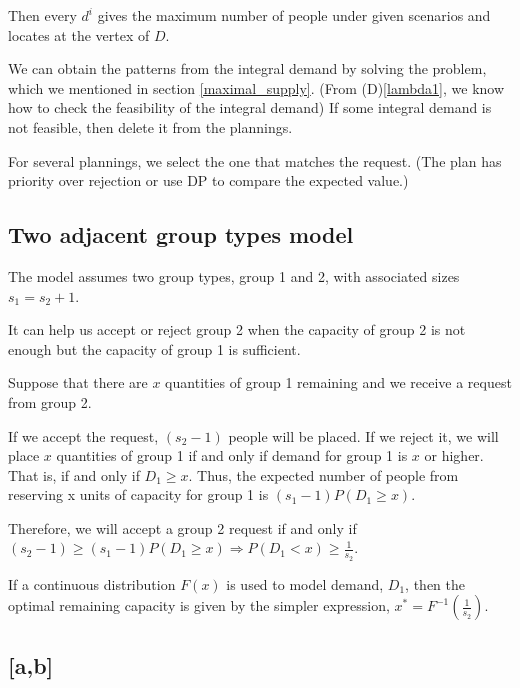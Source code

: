 Then every $d^{i}$ gives the maximum number of people under given scenarios and locates at the vertex of $D$.


We can obtain the patterns from the integral demand by
solving the problem, which we mentioned in section \ref{maximal_supply}. (From (D)\ref{lambda1}, we know how to check the feasibility of the integral demand) If some integral demand is not feasible, then delete it from the plannings.

For several plannings, we select the one that matches the request. (The plan has priority over rejection or use DP to compare the expected value.) 



\subsection{Two adjacent group types model}\label{sec_adjacent}
The model assumes two group types, group 1 and 2, with associated sizes $s_1 = s_2 + 1$.

It can help us accept or reject group 2 when the capacity of group 2 is not enough but the capacity of group 1 is sufficient.

Suppose that there are $x$ quantities of group 1 remaining and we receive a request from group 2.

If we accept the request, $(s_2 -1)$ people will be placed. If we reject it, we will place $x$ quantities of group 1 if and only if demand for group 1 is $x$ or higher. That is, if and only if $D_1 \geq x$. Thus, the expected number of people from reserving x units of capacity for group 1 is $(s_1-1)P(D_1 \geq x)$.

Therefore, we will accept a group 2 request if and only if $(s_{2}-1) \geq (s_{1}-1) P\left(D_{1} \geq x\right)
\Rightarrow P(D_1 < x) \geq \frac{1}{s_2}$.

If a continuous distribution $F(x)$ is used to model demand, $D_1$, then the optimal remaining capacity is given by the simpler expression, $x^{*} = F^{-1}(\frac{1}{s_2})$.

\subsection{[a,b]}

